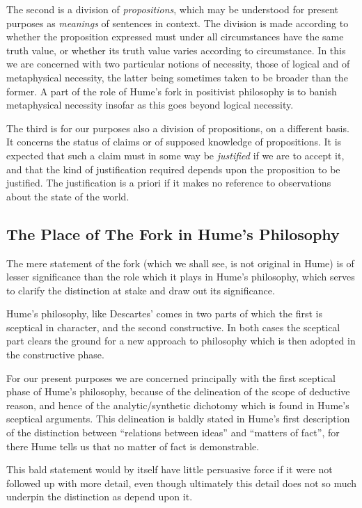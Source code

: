 The second is a division of {\it propositions}, which may be
understood for present purposes as {\it meanings} of sentences in
context.
The division is made according to whether the proposition
expressed must under all circumstances have the same truth value, or
whether its truth value varies according to circumstance.
In this we are concerned with two particular notions of necessity,
those of logical and of metaphysical necessity, the latter being
sometimes taken to be broader than the former.
A part of the role of Hume's fork in positivist philosophy is to
banish metaphysical necessity insofar as this goes beyond logical necessity.

The third is for our purposes also a division of propositions, on a
different basis.
It concerns the status of claims or of supposed knowledge of
propositions. 
It is expected that such a claim must in some way be
{\it justified} if we are to accept it, and that the kind of
justification required depends upon the proposition to be justified.
The justification is a priori if it makes no reference to observations
about the state of the world.

\subsection{The Place of The Fork in Hume's Philosophy}

The mere statement of the fork (which we shall see, is not original in
Hume) is of lesser significance than the role which it plays in Hume's
philosophy, which serves to clarify the distinction at stake and draw
out its significance.

Hume's philosophy, like Descartes' comes in two parts of which the
first is sceptical in character, and the second constructive.
In both cases the sceptical part clears the ground for a new approach
to philosophy which is then adopted in the constructive phase.

For our present purposes we are concerned principally with the first
sceptical phase of Hume's philosophy, because of the delineation of the scope
of deductive reason, and hence of the analytic/\-synthetic dichotomy
which is found in Hume's sceptical arguments.
This delineation is baldly stated in Hume's first description of the
distinction between ``relations between ideas'' and ``matters of
fact'', for there Hume tells us that no matter of fact is
demonstrable.

This bald statement would by itself have little persuasive force if it
were not followed up with more detail, even though ultimately this
detail does not so much underpin the distinction as depend upon it.

